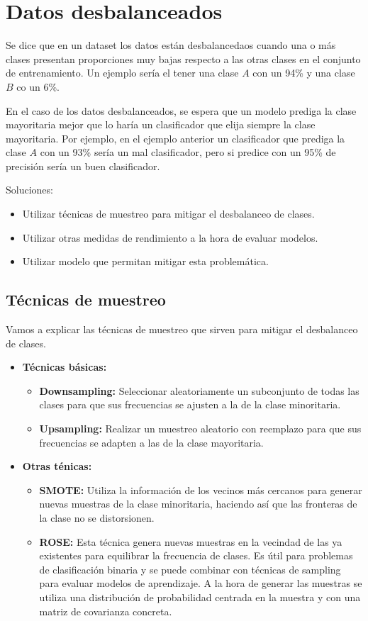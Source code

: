 \documentclass[12pt, letterpaper]{article}
\begin{document}
\newpage
\section{Datos desbalanceados}

Se dice que en un dataset los datos están desbalancedaos cuando una o más clases presentan proporciones muy bajas respecto a las otras clases en el conjunto de entrenamiento. Un ejemplo sería el tener una clase $A$ con un 94\% y una clase $B$ co un 6\%.

En el caso de los datos desbalanceados, se espera que un modelo prediga la clase mayoritaria mejor que lo haría un clasificador que elija siempre la clase mayoritaria. Por ejemplo, en el ejemplo anterior un clasificador que prediga la clase $A$ con un 93\% sería un mal clasificador, pero si predice con un 95\% de precisión sería un buen clasificador.

Soluciones:
\begin{itemize}
    \item Utilizar técnicas de muestreo para mitigar el desbalanceo de clases.
    \item Utilizar otras medidas de rendimiento a la hora de evaluar modelos.
    \item Utilizar modelo que permitan mitigar esta problemática.
\end{itemize}

\subsection{Técnicas de muestreo}
Vamos a explicar las técnicas de muestreo que sirven para mitigar el desbalanceo de clases.
\begin{itemize}
    \item \textbf{Técnicas básicas:}
    \begin{itemize}
        \item \textbf{Downsampling:} Seleccionar aleatoriamente un subconjunto de todas las clases para que sus frecuencias se ajusten a la de la clase minoritaria.
        \item \textbf{Upsampling:} Realizar un muestreo aleatorio con reemplazo para que sus frecuencias se adapten a las de la clase mayoritaria.
    \end{itemize}

    \item \textbf{Otras ténicas:}
    \begin{itemize}
        \item \textbf{SMOTE:} Utiliza la información de los vecinos más cercanos para generar nuevas muestras de la clase minoritaria, haciendo así que las fronteras de la clase no se distorsionen. 
        \item \textbf{ROSE:} Esta técnica genera nuevas muestras en la vecindad de las ya existentes para equilibrar la frecuencia de clases. Es útil para problemas de clasificación binaria y se puede combinar con técnicas de sampling para evaluar modelos de aprendizaje. A la hora de generar las muestras se utiliza una distribución de probabilidad centrada en la muestra y con una matriz de covarianza concreta.
    \end{itemize}
\end{itemize}
\end{document}
